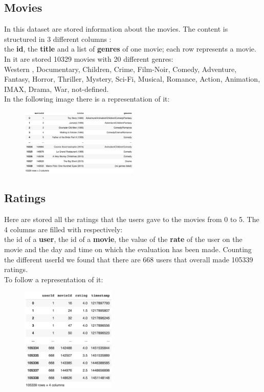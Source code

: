 \documentclass{article}
\begin{document}
\subsection{Movies}
In this dataset are stored information about the movies. The content is structured in 3 different columns : \\
the \textbf{id}, the \textbf{title} and a list of \textbf{genres} of one movie; each row represents a movie. In it are stored 10329 movies with 20 different genres:\\ Western , Documentary, Children, Crime, Film-Noir, Comedy, Adventure, Fantasy, Horror, Thriller, Mystery, Sci-Fi, Musical, Romance, Action, Animation, IMAX, Drama, War, not-defined. \\
In the following image there is a representation of it:
\begin{figure}[ht]
      \begin{center}
            \includegraphics[width=0.5\textwidth]{images/movies data.png}
      \end{center}
\end{figure}

\subsection{Ratings}
Here are stored all the ratings that the users gave to the movies from 0 to 5. The 4 columns are filled with respectively: \\the id of a \textbf{user}, the id of a \textbf{movie}, the value of the \textbf{rate} of the user on the movie and the day and time on which the evaluation has been made. Counting the different userId we found that there are 668 users that overall made 105339 ratings. \\
To follow a representation of it:
\begin{figure}[ht]
      \begin{center}
            \includegraphics[width=0.4\textwidth]{images/ratings data.png}
      \end{center}
\end{figure}
\end{document}
